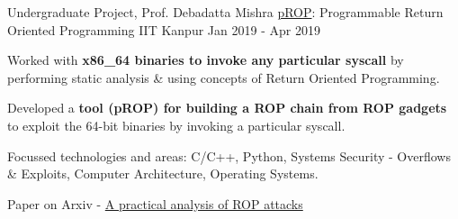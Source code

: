 \begin{cventries}





  \cventry
    {Undergraduate Project, Prof. Debadatta Mishra} %
    {\href{https://arxiv.org/abs/2111.03537}{pROP}: Programmable Return Oriented Programming} %
    {IIT Kanpur} %
    {Jan 2019 - Apr 2019} %
    {
      \begin{cvitems} %
      \item {Worked with \textbf{x86\_64 binaries to invoke any particular syscall} by performing static analysis \& using concepts of Return Oriented Programming.}
      \item {Developed a \textbf{tool (pROP) for building a ROP chain from ROP gadgets} to exploit the 64-bit binaries by invoking a particular syscall.}
      \item {Focussed technologies and areas: C/C++, Python, Systems Security - Overflows \& Exploits, Computer Architecture, Operating Systems.}
      \item {Paper on Arxiv - \href{https://arxiv.org/abs/2111.03537}{A practical analysis of ROP attacks}}
      \end{cvitems}
    }





\end{cventries}
